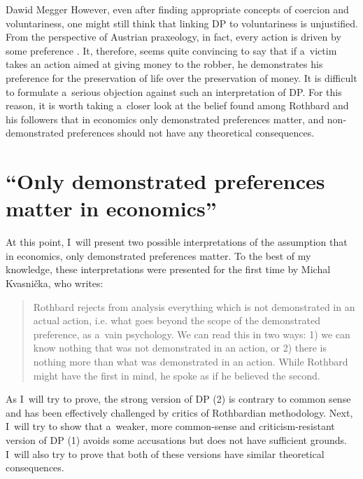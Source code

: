 \begin{artengenv}{Dawid Megger}
However, even after finding appropriate concepts of coercion and voluntariness, one might still think that linking DP to voluntariness is unjustified. From the perspective of Austrian praxeology, in fact, every action is driven by some preference 
\parencite[][pp.13–14, 92–98]{mises_human_1998}. %
 It, therefore, seems quite convincing to say that if a~victim takes an action aimed at giving money to the robber, he demonstrates his preference for the preservation of life over the preservation of money. It is difficult to formulate a~serious objection against such an interpretation of DP. For this reason, it is worth taking a~closer look at the belief found among Rothbard and his followers that in economics only demonstrated preferences matter, and non-demonstrated preferences should not have any theoretical consequences.



\section{``Only demonstrated preferences matter in economics''}

At this point, I~will present two possible interpretations of the assumption that in economics, only demonstrated preferences matter. To the best of my knowledge, these interpretations were presented for the first time by Michal Kvasnička, who writes:



\begin{quote}
Rothbard rejects from analysis everything which is not demonstrated in an actual action, i.e. what goes beyond the scope of the demonstrated preference, as a~vain psychology. We can read this in two ways: 1) we can know nothing that was not demonstrated in an action, or 2) there is nothing more than what was demonstrated in an action. While Rothbard might have the first in mind, he spoke as if he believed the second. 
\parencite[][p.44]{kvasnicka_rothbards_2008}%
\end{quote}




As I~will try to prove, the strong version of DP (2) is contrary to common sense and has been effectively challenged by critics of Rothbardian methodology. Next, I~will try to show that a~weaker, more common-sense and criticism-resistant version of DP (1) avoids some accusations but does not have sufficient grounds. I~will also try to prove that both of these versions have similar theoretical consequences.




\end{artengenv}
